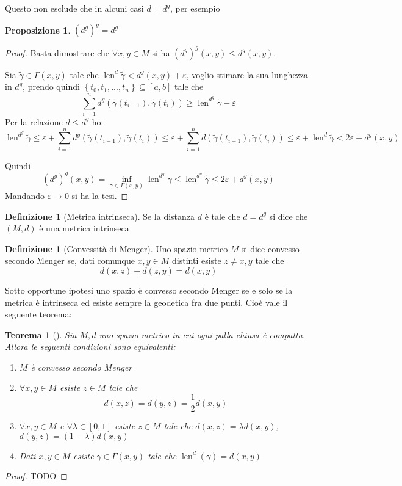 \documentclass[a4paper,10pt]{article}
\newcounter{counter1}
\theoremstyle{plain}
\newtheorem{myteo}[counter1]{Teorema}
\newtheorem{mypro}[counter1]{Proposizione}
\theoremstyle{definition}
\newtheorem{mydef}[counter1]{Definizione}
\theoremstyle{remark}
\newcommand{\set}[1]{\left\{#1\right\}}
\newcommand{\pa}[1]{\left(#1\right)}
\newcommand{\bra}[1]{\left[#1\right]}
\DeclareMathOperator{\len}{len}
\begin{document}
Questo non esclude che in alcuni casi $d = d^g$, per esempio
\begin{mypro}
  $\pa{d^g}^g = d^g$
\end{mypro}
\begin{proof}
  Basta dimostrare che $\forall x,y \in M$ si ha $\pa{d^g}^g(x,y) \le
  d^g(x,y)$.

  Sia $\tilde\gamma \in \Gamma(x,y)$ tale che $\len ^d \tilde\gamma <
  d^g(x,y) + \varepsilon$, voglio stimare la sua lunghezza in $d^g$,
  prendo quindi $\set{t_0,t_1,...,t_n} \subseteq \bra{a,b}$ tale che
  \[ \sum _{i=1} ^n d^g(\tilde\gamma(t_{i-1}),\tilde\gamma(t_i)) \ge
  \len ^{d^g} \tilde\gamma - \varepsilon \] Per la relazione $d\le
  d^g$ ho:
  \[ \len ^{d^g} \tilde\gamma \le \varepsilon + \sum _{i=1} ^n
  d^g(\tilde\gamma(t_{i-1}),\tilde\gamma(t_i)) \le \varepsilon + \sum
  _{i=1} ^n d(\tilde\gamma(t_{i-1}),\tilde\gamma(t_i)) \le \varepsilon
  + \len ^d \tilde\gamma < 2 \varepsilon + d^g(x,y) \]

  Quindi
  \[ \pa{d^g}^g (x,y) = \inf _{\gamma \in \Gamma(x,y)} \len ^{d^g}
  \gamma \le \len ^{d^g} \tilde\gamma \le 2 \varepsilon + d^g(x,y) \]
  Mandando $\varepsilon \to 0$ si ha la tesi.
\end{proof}

\begin{mydef}[Metrica intrinseca]
  Se la distanza $d$ è tale che $d = d^g$ si dice che $(M,d)$ è una
  metrica intrinseca
\end{mydef}

\begin{mydef}[Convessità di Menger]
  Uno spazio metrico $M$ si dice convesso secondo Menger se, dati
  comunque $x,y \in M$ distinti esiste $z\neq x,y$ tale che
  \[ d(x,z) + d(z,y) = d(x,y) \]
\end{mydef}

Sotto opportune ipotesi uno spazio è convesso secondo Menger se e solo
se la metrica è intrinseca ed esiste sempre la geodetica fra due
punti. Cioè vale il seguente teorema:

\begin{myteo}[{\cite[Teorema 2.6.2]{papadopoulos2013metric}}]
  Sia $M,d$ uno spazio metrico in cui ogni palla chiusa è
  compatta. Allora le seguenti condizioni sono equivalenti:
  \begin{enumerate}
  \item $M$ è convesso secondo Menger
  \item $\forall x,y \in M$ esiste $z\in M$ tale che 
    \[ d(x,z) = d(y,z) = \frac{1}{2} d(x,y) \]
  \item $\forall x,y \in M$ e $\forall \lambda \in \bra{0,1}$ esiste
    $z\in M$ tale che $d(x,z) = \lambda d(x,y)$, $d(y,z) = (1-\lambda)
    d(x,y)$ 
  \item Dati $x,y \in M$ esiste $\gamma \in \Gamma(x,y)$ tale che
    $\len ^d (\gamma) = d(x,y)$
  \end{enumerate}
\end{myteo}
\begin{proof}
  TODO
\end{proof}
\end{document}
